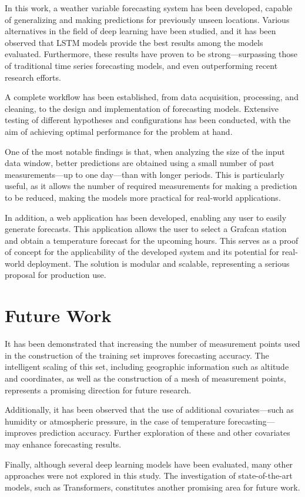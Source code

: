 In this work, a weather variable forecasting system has been developed, capable of generalizing and making predictions for previously unseen locations. Various alternatives in the field of deep learning have been studied, and it has been observed that LSTM models provide the best results among the models evaluated. Furthermore, these results have proven to be strong—surpassing those of traditional time series forecasting models, and even outperforming recent research efforts.

A complete workflow has been established, from data acquisition, processing, and cleaning, to the design and implementation of forecasting models. Extensive testing of different hypotheses and configurations has been conducted, with the aim of achieving optimal performance for the problem at hand.

One of the most notable findings is that, when analyzing the size of the input data window, better predictions are obtained using a small number of past measurements—up to one day—than with longer periods. This is particularly useful, as it allows the number of required measurements for making a prediction to be reduced, making the models more practical for real-world applications.

In addition, a web application has been developed, enabling any user to easily generate forecasts. This application allows the user to select a Grafcan station and obtain a temperature forecast for the upcoming hours. This serves as a proof of concept for the applicability of the developed system and its potential for real-world deployment. The solution is modular and scalable, representing a serious proposal for production use.

\section{Future Work}

It has been demonstrated that increasing the number of measurement points used in the construction of the training set improves forecasting accuracy. The intelligent scaling of this set, including geographic information such as altitude and coordinates, as well as the construction of a mesh of measurement points, represents a promising direction for future research.

Additionally, it has been observed that the use of additional covariates—such as humidity or atmospheric pressure, in the case of temperature forecasting—improves prediction accuracy. Further exploration of these and other covariates may enhance forecasting results.

Finally, although several deep learning models have been evaluated, many other approaches were not explored in this study. The investigation of state-of-the-art models, such as Transformers, constitutes another promising area for future work.